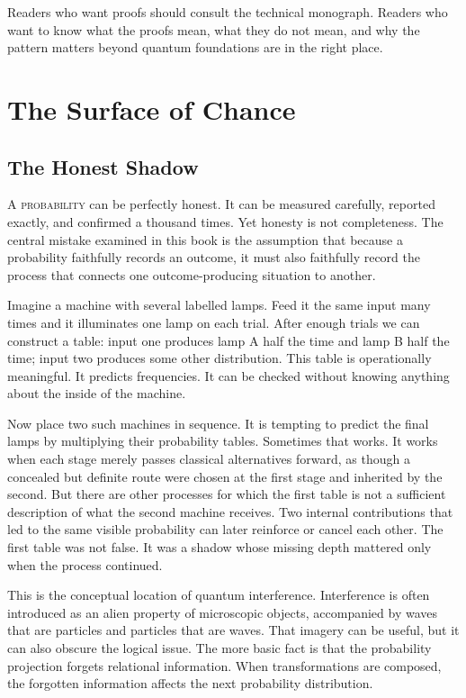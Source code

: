 \documentclass[12pt,openany]{book}
\begin{document}
Readers who want proofs should consult the technical monograph. Readers who want to know what the proofs mean, what they do not mean, and why the pattern matters beyond quantum foundations are in the right place.

\tableofcontents

\mainmatter
\part{The Surface of Chance}

\chapter{The Honest Shadow}
\lettrine{A}{ probability} can be perfectly honest. It can be measured carefully, reported exactly, and confirmed a thousand times. Yet honesty is not completeness. The central mistake examined in this book is the assumption that because a probability faithfully records an outcome, it must also faithfully record the process that connects one outcome-producing situation to another.

Imagine a machine with several labelled lamps. Feed it the same input many times and it illuminates one lamp on each trial. After enough trials we can construct a table: input one produces lamp A half the time and lamp B half the time; input two produces some other distribution. This table is operationally meaningful. It predicts frequencies. It can be checked without knowing anything about the inside of the machine.

Now place two such machines in sequence. It is tempting to predict the final lamps by multiplying their probability tables. Sometimes that works. It works when each stage merely passes classical alternatives forward, as though a concealed but definite route were chosen at the first stage and inherited by the second. But there are other processes for which the first table is not a sufficient description of what the second machine receives. Two internal contributions that led to the same visible probability can later reinforce or cancel each other. The first table was not false. It was a shadow whose missing depth mattered only when the process continued.

This is the conceptual location of quantum interference. Interference is often introduced as an alien property of microscopic objects, accompanied by waves that are particles and particles that are waves. That imagery can be useful, but it can also obscure the logical issue. The more basic fact is that the probability projection forgets relational information. When transformations are composed, the forgotten information affects the next probability distribution.
\end{document}
